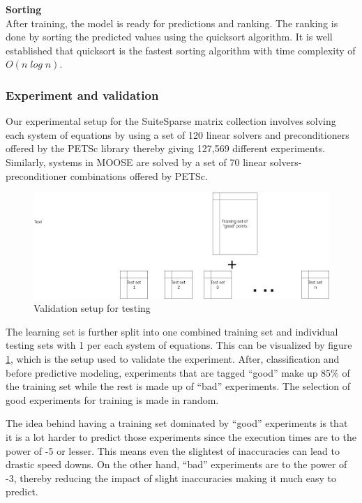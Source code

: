 \textbf{Sorting}\\
After training, the model is ready for predictions and ranking. The ranking is done by sorting the predicted values using the quicksort algorithm. It is well established that quicksort is the fastest sorting algorithm with time complexity of $O(n\;log\;n)$.


\subsubsection{Experiment and validation}
Our experimental setup for the SuiteSparse matrix collection involves solving each system of equations by using a set of 120 linear solvers and preconditioners offered by the PETSc library  thereby giving 127,569 different experiments. Similarly, systems in MOOSE are solved by a set of 70 linear solvers-preconditioner combinations offered by PETSc. 


\begin{figure}
    \centering
    \includegraphics[width=1\columnwidth]{figures/rank_split.png}
    \caption{Validation setup for testing}
    \label{Validation setup for testing}
\end{figure}

The learning set is further split into one combined training set and individual testing sets with 1 per each system of equations. This can be visualized by figure \ref{Validation setup for testing}, which is the setup used to validate the experiment. After, classification and before predictive modeling, experiments that are tagged ``good'' make up 85\% of the training set while the rest is made up of ``bad'' experiments. The selection of good experiments for training is made in random.

The idea behind having a training set dominated by ``good'' experiments is that it is a lot harder to predict those experiments since the execution times are to the power of -5 or lesser. This means even the slightest of inaccuracies can lead to drastic speed downs. On the other hand, ``bad'' experiments are to the power of -3, thereby reducing the impact of slight inaccuracies making it much easy to predict.

